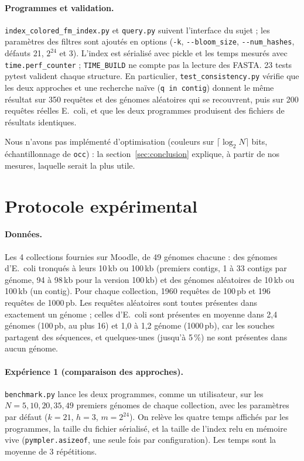 \documentclass[11pt,a4paper]{article}
\begin{document}
\paragraph{Programmes et validation.} \texttt{index\_colored\_fm\_index.py}
et \texttt{query.py} suivent l'interface du sujet ; les paramètres des
filtres sont ajoutés en options (\texttt{-k}, \texttt{-{}-bloom\_size},
\texttt{-{}-num\_hashes}, défauts 21, $2^{24}$ et 3). L'index est sérialisé
avec pickle et les temps mesurés avec \texttt{time.perf\_counter} ;
\texttt{TIME\_BUILD} ne compte pas la lecture des FASTA. 23 tests pytest
valident chaque structure. En particulier, \texttt{test\_consistency.py}
vérifie que les deux approches et une recherche naïve (\texttt{q in contig})
donnent le même résultat sur 350 requêtes et des génomes aléatoires qui se
recouvrent, puis sur 200 requêtes réelles E.~coli, et que les deux programmes
produisent des fichiers de résultats identiques.

Nous n'avons pas implémenté d'optimisation (couleurs sur $\lceil\log_2
N\rceil$ bits, échantillonnage de \texttt{occ}) : la section~\ref{sec:conclusion}
explique, à partir de nos mesures, laquelle serait la plus utile.

\section{Protocole expérimental}

\paragraph{Données.} Les 4 collections fournies sur Moodle, de 49 génomes
chacune : des génomes d'E.~coli tronqués à leurs 10\,kb ou 100\,kb
(premiers contigs, 1 à 33 contigs par génome, 94 à 98\,kb pour la version
100\,kb) et des génomes aléatoires de 10\,kb ou 100\,kb (un contig). Pour
chaque collection, 1960 requêtes de 100\,pb et 196 requêtes de 1000\,pb.
Les requêtes aléatoires sont toutes présentes dans exactement un génome ;
celles d'E.~coli sont présentes en moyenne dans 2,4 génomes (100\,pb, au plus
16) et 1,0 à 1,2 génome (1000\,pb), car les souches partagent des séquences,
et quelques-unes (jusqu'à 5\,\%) ne sont présentes dans aucun génome.

\paragraph{Expérience 1 (comparaison des approches).}
\texttt{benchmark.py} lance les deux programmes, comme un utilisateur, sur les
$N = 5, 10, 20, 35, 49$ premiers génomes de chaque collection, avec les
paramètres par défaut ($k = 21$, $h = 3$, $m = 2^{24}$). On relève les quatre
temps affichés par les programmes, la taille du fichier sérialisé, et la
taille de l'index relu en mémoire vive (\texttt{pympler.asizeof}, une seule
fois par configuration). Les temps sont la moyenne de 3 répétitions.
\end{document}
